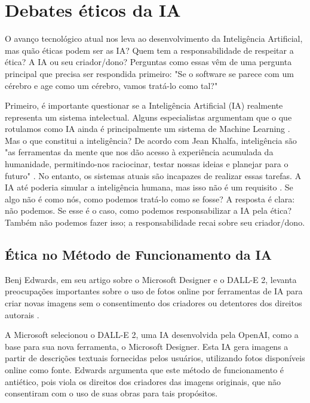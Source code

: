 \documentclass[referee,sn-basic]{sn-jnl}
\theoremstyle{thmstyleone}%
\begin{document}
\section{Debates éticos da IA}

\hspace{0.7cm}O avanço tecnológico atual nos leva ao desenvolvimento da Inteligência Artificial, mas quão éticas podem ser as IA? Quem tem a responsabilidade de respeitar a ética? A IA ou seu criador/dono? Perguntas como essas vêm de uma pergunta principal que precisa ser respondida primeiro: "Se o software se parece com um cérebro e age como um cérebro, vamos tratá-lo como tal?" \cite{morber2015software}\par

Primeiro, é importante questionar se a Inteligência Artificial (IA) realmente representa um sistema intelectual. Alguns especialistas argumentam que o que rotulamos como IA ainda é principalmente um sistema de Machine Learning \cite{schmelzer2019}. Mas o que constitui a inteligência? De acordo com Jean Khalfa, inteligência são "as ferramentas da mente que nos dão acesso à experiência acumulada da humanidade, permitindo-nos raciocinar, testar nossas ideias e planejar para o futuro" \cite{Khalfa1994-KHAWII-2}. No entanto, os sistemas atuais são incapazes de realizar essas tarefas. A IA até poderia simular a inteligência humana, mas isso não é um requisito \cite{mccarthy2007artificial}. Se algo não é como nós, como podemos tratá-lo como se fosse? A resposta é clara: não podemos. Se esse é o caso, como podemos responsabilizar a IA pela ética? Também não podemos fazer isso; a responsabilidade recai sobre seu criador/dono.


\subsection{Ética no Método de Funcionamento da IA}
\hspace{0.7cm}Benj Edwards, em seu artigo sobre o Microsoft Designer e o DALL-E 2, levanta preocupações importantes sobre o uso de fotos online por ferramentas de IA para criar novas imagens sem o consentimento dos criadores ou detentores dos direitos autorais \cite{edwards2022microsoft}.\par

A Microsoft selecionou o DALL-E 2, uma IA desenvolvida pela OpenAI, como a base para sua nova ferramenta, o Microsoft Designer. Esta IA gera imagens a partir de descrições textuais fornecidas pelos usuários, utilizando fotos disponíveis online como fonte. Edwards argumenta que este método de funcionamento é antiético, pois viola os direitos dos criadores das imagens originais, que não consentiram com o uso de suas obras para tais propósitos.\par
\end{document}

